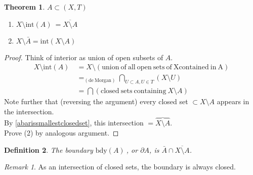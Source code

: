\documentclass{article}
\newcommand{\Int}[1]{\mathrm{int}(#1)\ }
\newcommand{\bdy}[1]{\mathrm{bdy}(#1)\ }
\newtheorem{stheorem}{Theorem}[theorem]
\newtheorem{sdefinition}[stheorem]{Definition}
\theoremstyle{remark}
\theoremstyle{example}
\theoremstyle{examples}
\newtheorem*{remark}{Remark}
\begin{document}
	\begin{stheorem}
		$A \subset(X,T)$ \begin{enumerate}
			\item $X \setminus \Int{A}=\overline{X \setminus A}$
			\item $X \setminus \bar{A} = \Int{X \setminus A}$
		\end{enumerate}
	\end{stheorem}
	\begin{proof}
		Think of interior as union of open subsets of $A$.
		\begin{align*}
			X \setminus \Int{A} &= X \setminus \mathrm{(union\ of\ all\ open\ sets\ of\ X contained\ in\ A)}\\
			& =_{(\mathrm{de\ Morgan})} \bigcap_{U \subset A, U \in T}\left(X \setminus U \right)\\
			& = \bigcap \left(\mathrm{closed\ sets\ containing\ } X \setminus A\right)
		\end{align*}
		Note further that (reversing the argument) every closed set $\subset X \setminus A$ appears in the intersection.\\
		By \ref{abarissmallestclosedset}, this intersection $=\overbrace{X \setminus A}$.\\
		Prove (2) by analogous argument.
	\end{proof}
	
	\begin{sdefinition}
		The boundary $\bdy{A}$, or $\partial A$, is $\bar{A}\cap\overline{X \setminus A}$.
	\end{sdefinition}

	\begin{remark}
		As an intersection of closed sets, the boundary is always closed.
	\end{remark}
\end{document}
